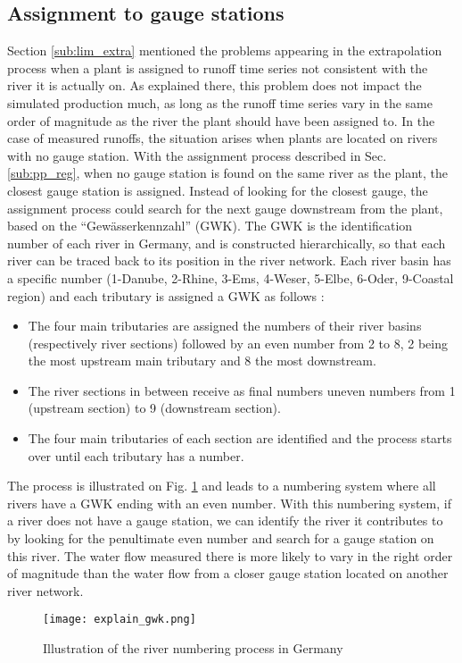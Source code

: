 \subsection{Assignment to gauge stations}
\label{sub:imp_assign_gauge}
Section \ref{sub:lim_extra} mentioned the problems appearing in the extrapolation process when a plant is assigned to runoff time series not consistent with the river it is actually on. As explained there, this problem does not impact the simulated production much, as long as the runoff time series vary in the same order of magnitude as the river the plant should have been assigned to. In the case of measured runoffs, the situation arises when plants are located on rivers with no gauge station. With the assignment process described in Sec. \ref{sub:pp_reg}, when no gauge station is found on the same river as the plant, the closest gauge station is assigned. \newline
Instead of looking for the closest gauge, the assignment process could search for the next gauge downstream from the plant, based on the ``Gewässerkennzahl'' (GWK). The GWK is the identification number of each river in Germany, and is constructed hierarchically, so that each river can be traced back to its position in the river network. Each river basin has a specific number (1-Danube, 2-Rhine, 3-Ems, 4-Weser, 5-Elbe, 6-Oder, 9-Coastal region) and each tributary is assigned a GWK as follows :
\begin{itemize}
 \item The four main tributaries are assigned the numbers of their river basins (respectively river sections) followed by an even number from 2 to 8, 2 being the most upstream main tributary and 8 the most downstream.
 \item The river sections in between receive as final numbers uneven numbers from 1 (upstream section) to 9 (downstream section).
 \item The four main tributaries of each section are identified and the process starts over until each tributary has a number.
\end{itemize}
The process is illustrated on Fig. \ref{explain_gwk} and leads to a numbering system where all rivers have a GWK ending with an even number. With this numbering system, if a river does not have a gauge station, we can identify the river it contributes to by looking for the penultimate even number and search for a gauge station on this river. The water flow measured there is more likely to vary in the right order of magnitude than the water flow from a closer gauge station located on another river network.
\begin{figure}[H]
\centering
\texttt{[image: explain\_gwk.png]}
\caption{Illustration of the river numbering process in Germany}
\label{explain_gwk}
\end{figure}


